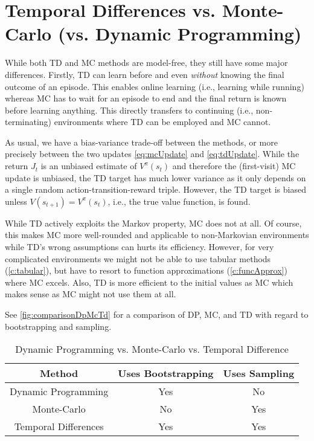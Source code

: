 	\section{Temporal Differences vs. Monte-Carlo (vs. Dynamic Programming)}
		While both \ac{TD} and \ac{MC} methods are model-free, they still have some major differences. Firstly, \ac{TD} can learn before and even \emph{without} knowing the final outcome of an episode. This enables online learning (i.e., learning while running) whereas \ac{MC} has to wait for an episode to end and the final return is known before learning anything. This directly transfers to continuing (i.e., non-terminating) environments where \ac{TD} can be employed and \ac{MC} cannot.

		As usual, we have a bias-variance trade-off between the methods, or more precisely between the two updates \eqref{eq:mcUpdate} and \eqref{eq:tdUpdate}. While the return \(J_t\) is an unbiased estimate of \(V^\pi(s_t)\) and therefore the (first-visit) \ac{MC} update is unbiased, the \ac{TD} target has much lower variance as it only depends on a single random action-transition-reward triple. However, the \ac{TD} target is biased unless \( V(s_{t + 1}) = V^\pi(s_t) \), i.e., the true value function, is found.

		While \ac{TD} actively exploits the Markov property, \ac{MC} does not at all. Of course, this makes \ac{MC} more well-rounded and applicable to non-Markovian environments while \ac{TD}'s wrong assumptions can hurts its efficiency. However, for very complicated environments we might not be able to use tabular methods (\autoref{c:tabular}), but have to resort to function approximations (\autoref{c:funcApprox}) where \ac{MC} excels. Also, \ac{TD} is more efficient to the initial values as \ac{MC} which makes sense as \ac{MC} might not use them at all.

		See \autoref{fig:comparisonDpMcTd} for a comparison of \ac{DP}, \ac{MC}, and \ac{TD} with regard to bootstrapping and sampling.

		\begin{table}
			\centering
			\begin{tabular}{c|cc}
				\toprule
				\textbf{Method}      & \textbf{Uses Bootstrapping} & \textbf{Uses Sampling} \\ \midrule
				Dynamic Programming  & Yes                         & No                     \\
				Monte-Carlo          & No                          & Yes                    \\
				Temporal Differences & Yes                         & Yes                    \\ \bottomrule
			\end{tabular}
			\caption{Dynamic Programming vs. Monte-Carlo vs. Temporal Difference}
			\label{fig:comparisonDpMcTd}
		\end{table}

